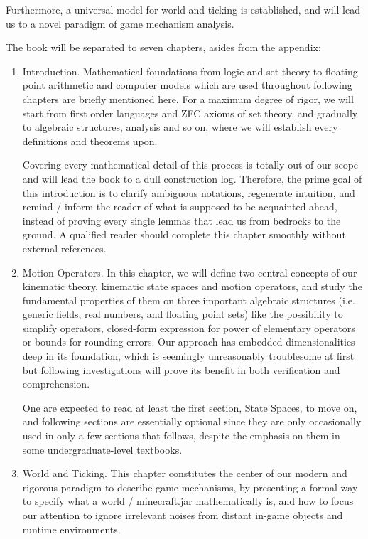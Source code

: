 \documentclass{book}
\theoremstyle{definition}\newtheorem{mechanism}{Mechanism}
\theoremstyle{remark}\newtheorem*{remark}{Remark}
\begin{document}
Furthermore, a universal model for world and ticking is established, and will lead us to a novel paradigm of game mechanism analysis.

The book will be separated to seven chapters, asides from the appendix:

\begin{enumerate}
	\item Introduction. Mathematical foundations from logic and set theory to floating point arithmetic and computer models which are used throughout following chapters are briefly mentioned here. For a maximum degree of rigor, we will start from first order languages and ZFC axioms of set theory, and gradually to algebraic structures, analysis and so on, where we will establish every definitions and theorems upon.
	
	Covering every mathematical detail of this process is totally out of our scope and will lead the book to a dull construction log. Therefore, the prime goal of this introduction is to clarify ambiguous notations, regenerate intuition, and remind / inform the reader of what is supposed to be acquainted ahead, instead of proving every single lemmas that lead us from bedrocks to the ground. A qualified reader should complete this chapter smoothly without external references.
	
	\item Motion Operators. In this chapter, we will define two central concepts of our kinematic theory, kinematic state spaces and motion operators, and study the fundamental properties of them on three important algebraic structures (i.e. generic fields, real numbers, and floating point sets) like the possibility to simplify operators, closed-form expression for power of elementary operators or bounds for rounding errors. Our approach has embedded dimensionalities deep in its foundation, which is seemingly unreasonably troublesome at first but following investigations will prove its benefit in both verification and comprehension.
	
	One are expected to read at least the first section, State Spaces, to move on, and following sections are essentially optional since they are only occasionally used in only a few sections that follows, despite the emphasis on them in some undergraduate-level textbooks.
	
	\item World and Ticking. This chapter constitutes the center of our modern and rigorous paradigm to describe game mechanisms, by presenting a formal way to specify what a world / minecraft.jar mathematically is, and how to focus our attention to ignore irrelevant noises from distant in-game objects and runtime environments.
	

\end{enumerate}
\end{document}
